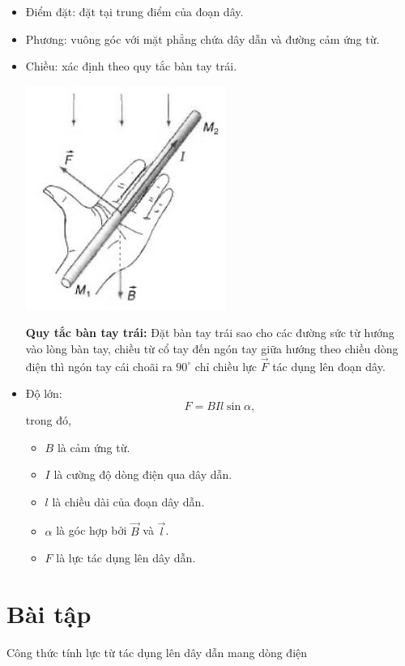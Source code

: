 \begin{itemize}
	\item Điểm đặt: đặt tại trung điểm của đoạn dây.
	\item Phương: vuông góc với mặt phẳng chứa dây dẫn và đường cảm ứng từ.
	\item Chiều: xác định theo quy tắc bàn tay trái.  
	
	\begin{center}
		\includegraphics[scale=0.8]{../figs/VN11-PH-25-L-017-1-h105.jpg}
	\end{center}
\textbf{Quy tắc bàn tay trái:} Đặt bàn tay trái sao cho các đường sức từ hướng vào lòng bàn tay, chiều từ cổ tay đến ngón tay giữa hướng theo chiều dòng điện thì ngón tay cái choãi ra $90^\circ$ chỉ chiều lực $\vec{F}$ tác dụng lên đoạn dây.	
	
	\item Độ lớn: 
	\begin{equation}
	F=BIl\sin \alpha,
	\end{equation}
	trong đó,
	\begin{itemize}
		\item $B$ là cảm ứng từ.
		\item $I$ là cường độ dòng điện qua dây dẫn.  
		\item $l$ là chiều dài của đoạn dây dẫn.
		\item $\alpha$ là góc hợp bởi $\vec{B}$ và $\vec{l}$.
		\item $F$ là lực tác dụng lên dây dẫn. 
	\end{itemize}
	
\end{itemize}	


\section{Bài tập}
\begin{dang}{Công thức tính lực từ tác dụng lên dây dẫn mang dòng điện}
\end{dang}

